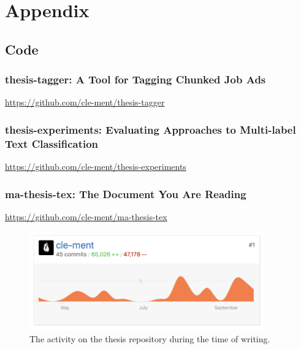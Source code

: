 
\renewcommand{\theequation}{B\arabic{equation}}
\setcounter{equation}{0}
\renewcommand{\thefigure}{B\arabic{figure}}
\setcounter{figure}{0}
\renewcommand{\thetable}{B\arabic{table}}
\setcounter{table}{0}


\clearpage

\thesisappendix

\section{Appendix}

\subsection{Code}

\subsubsection*{thesis-tagger: A Tool for Tagging Chunked Job Ads}
\label{sub:thesis-tagger: A Tool for Tagging Chunked Job Ads}

\url{https://github.com/cle-ment/thesis-tagger}

\subsubsection*{thesis-experiments: Evaluating Approaches to Multi-label Text Classification}
\label{sub:thesis-experiments: Evaluating Approaches to Multi-label Text Classification}


\url{https://github.com/cle-ment/thesis-experiments}

\subsubsection*{ma-thesis-tex: The Document You Are Reading}
\label{sub:ma-thesis-tex: The Document You Are Reading}

\url{https://github.com/cle-ment/ma-thesis-tex}

\begin{figure}[h]
  \centering
  \includegraphics[width=0.9\textwidth]{img/git-tex.png}
  \caption{The activity on the thesis repository during the time of writing.}
\label{fig:RNN}
\end{figure}


